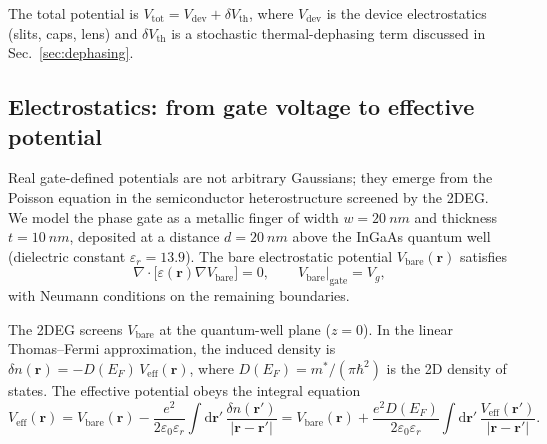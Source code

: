 \documentclass[11pt,a4paper]{article}
\newcommand{\dd}{\mathrm{d}}
\begin{document}
The total potential is $V_{\text{tot}} = V_{\text{dev}} + \delta V_{\text{th}}$, 
where $V_{\text{dev}}$ is the device electrostatics (slits, caps, lens) and 
$\delta V_{\text{th}}$ is a stochastic thermal-dephasing term discussed in 
Sec.~\ref{sec:dephasing}.

\subsection{Electrostatics: from gate voltage to effective potential}
\label{sec:electrostatics}

Real gate-defined potentials are not arbitrary Gaussians; they emerge from the 
Poisson equation in the semiconductor heterostructure screened by the 2DEG. 
We model the phase gate as a metallic finger of width $w=\SI{20}{nm}$ and 
thickness $t=\SI{10}{nm}$, deposited at a distance $d=\SI{20}{nm}$ above the 
InGaAs quantum well (dielectric constant $\varepsilon_r=13.9$). The bare 
electrostatic potential $V_{\text{bare}}(\mathbf{r})$ satisfies
\begin{equation}
\nabla\cdot\big[\varepsilon(\mathbf{r})\nabla V_{\text{bare}}\big] = 0,
\qquad V_{\text{bare}}\big|_{\text{gate}} = V_g,
\label{eq:poisson}
\end{equation}
with Neumann conditions on the remaining boundaries.

The 2DEG screens $V_{\text{bare}}$ at the quantum-well plane ($z=0$). In the 
linear Thomas--Fermi approximation, the induced density is 
$\delta n(\mathbf{r}) = -D(E_F)\,V_{\text{eff}}(\mathbf{r})$, where 
$D(E_F)=m^*/(\pi\hbar^2)$ is the 2D density of states. The effective 
potential obeys the integral equation
\begin{equation}
V_{\text{eff}}(\mathbf{r}) = V_{\text{bare}}(\mathbf{r}) - 
\frac{e^2}{2\varepsilon_0\varepsilon_r}\int \dd\mathbf{r}'\,
\frac{\delta n(\mathbf{r}')}{|\mathbf{r}-\mathbf{r}'|}
= V_{\text{bare}}(\mathbf{r}) + \frac{e^2 D(E_F)}{2\varepsilon_0\varepsilon_r}
\int \dd\mathbf{r}'\,\frac{V_{\text{eff}}(\mathbf{r}')}{|\mathbf{r}-\mathbf{r}'|}.
\label{eq:thomas-fermi}
\end{equation}
\end{document}
